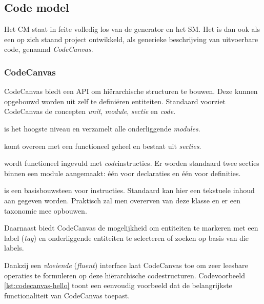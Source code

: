 
\subsection{Code model}
\label{subsection:devel-code-model}

Het CM staat in feite volledig los van de generator en het SM. Het is dan ook
als een op zich staand project ontwikkeld, als generieke beschrijving van
uitvoerbare code, genaamd \emph{CodeCanvas}.

\subsubsection{CodeCanvas}

CodeCanvas biedt een API om hi\"erarchische structuren te bouwen. Deze kunnen
opgebouwd worden uit zelf te defini\"eren entiteiten. Standaard voorziet
CodeCanvas de concepten \emph{unit}, \emph{module}, \emph{sectie} en
\emph{code}.

\begin{description}[itemsep=1pt, topsep=2pt, partopsep=2pt]

  \item[Unit] is het hoogste niveau en verzamelt alle onderliggende
  \emph{modules}.
  
  \item[Module] komt overeen met een functioneel geheel en bestaat uit
  \emph{secties}.
  
  \item[Sectie] wordt functioneel ingevuld met \emph{code}instructies. Er
  worden standaard twee secties binnen een module aangemaakt: \'e\'en voor
  declaraties en \'e\'en voor definities.
  
  \item[Code] is een basisbouwsteen voor instructies. Standaard kan hier een
  tekstuele inhoud aan gegeven worden. Praktisch zal men overerven van deze
  klasse en er een taxonomie mee opbouwen.

\end{description}

\noindent Daarnaast biedt CodeCanvas de mogelijkheid om entiteiten te markeren
met een label (\emph{tag}) en onderliggende entiteiten te selecteren of zoeken
op basis van die labels.

Dankzij een \emph{vloeiende} (\emph{fluent}) interface laat CodeCanvas toe om
zeer leesbare operaties te formuleren op deze hi\"erarchische codestructuren.
Codevoorbeeld \ref{lst:codecanvas-hello} toont een eenvoudig voorbeeld dat de
belangrijkste functionaliteit van CodeCanvas toepast.


